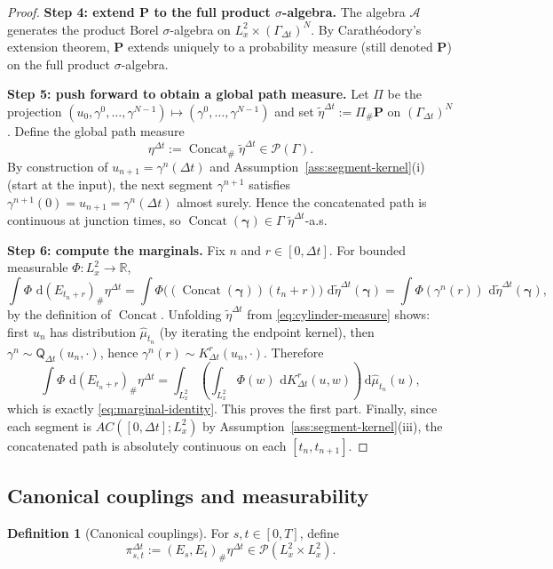 \documentclass{article}
\numberwithin{equation}{section}
\theoremstyle{plain}
\theoremstyle{definition}
\newtheorem{definition}[theorem]{Definition}
\theoremstyle{remark}
\newcommand{\R}{\mathbb{R}}
\newcommand{\Pcal}{\mathcal{P}}
\newcommand{\dd}{\,\mathrm{d}}
\DeclareMathOperator{\Concat}{Concat}
\begin{document}
\begin{proof}
\smallskip
\noindent\textbf{Step 4: extend $\mathbf P$ to the full product $\sigma$-algebra.}
The algebra $\mathcal A$ generates the product Borel $\sigma$-algebra on $L^2_x\times(\Gamma_{\Delta t})^N$.
By Carath\'eodory's extension theorem, $\mathbf P$ extends uniquely to a probability measure (still denoted $\mathbf P$)
on the full product $\sigma$-algebra.

\smallskip
\noindent\textbf{Step 5: push forward to obtain a global path measure.}
Let $\Pi$ be the projection $(u_0,\gamma^0,\dots,\gamma^{N-1})\mapsto(\gamma^0,\dots,\gamma^{N-1})$ and set
$\widetilde\eta^{\Delta t}:=\Pi_\#\mathbf P$ on $(\Gamma_{\Delta t})^N$.
Define the global path measure
\[
\eta^{\Delta t}:=\Concat_\#\widetilde\eta^{\Delta t}\in\Pcal(\Gamma).
\]
By construction of $u_{n+1}=\gamma^n(\Delta t)$ and Assumption~\ref{ass:segment-kernel}(i) (start at the input),
the next segment $\gamma^{n+1}$ satisfies $\gamma^{n+1}(0)=u_{n+1}=\gamma^n(\Delta t)$ almost surely.
Hence the concatenated path is continuous at junction times, so $\Concat(\bm\gamma)\in\Gamma$ $\widetilde\eta^{\Delta t}$-a.s.

\smallskip
\noindent\textbf{Step 6: compute the marginals.}
Fix $n$ and $r\in[0,\Delta t]$. For bounded measurable $\Phi:L^2_x\to\R$,
\[
\int \Phi\,\dd(E_{t_n+r})_\#\eta^{\Delta t}
=
\int \Phi\big((\Concat(\bm\gamma))(t_n+r)\big)\,\dd\widetilde\eta^{\Delta t}(\bm\gamma)
=
\int \Phi(\gamma^n(r))\,\dd\widetilde\eta^{\Delta t}(\bm\gamma),
\]
by the definition of $\Concat$. Unfolding $\widetilde\eta^{\Delta t}$ from \eqref{eq:cylinder-measure} shows:
first $u_n$ has distribution $\widehat\mu_{t_n}$ (by iterating the endpoint kernel),
then $\gamma^n\sim\mathsf Q_{\Delta t}(u_n,\cdot)$, hence $\gamma^n(r)\sim K^r_{\Delta t}(u_n,\cdot)$.
Therefore
\[
\int \Phi\,\dd(E_{t_n+r})_\#\eta^{\Delta t}
=
\int_{L^2_x}\left(\int_{L^2_x}\Phi(w)\,\dd K^r_{\Delta t}(u,w)\right)\dd\widehat\mu_{t_n}(u),
\]
which is exactly \eqref{eq:marginal-identity}. This proves the first part.
Finally, since each segment is $AC([0,\Delta t];L^2_x)$ by Assumption~\ref{ass:segment-kernel}(iii),
the concatenated path is absolutely continuous on each $[t_n,t_{n+1}]$.
\end{proof}

\subsection{Canonical couplings and measurability}

\begin{definition}[Canonical couplings]\label{def:canonical-couplings}
For $s,t\in[0,T]$, define
\begin{equation}\label{eq:def-pist}
\pi^{\Delta t}_{s,t}:=(E_s,E_t)_\#\eta^{\Delta t}\in\Pcal(L^2_x\times L^2_x).
\end{equation}
\end{definition}
\end{document}
